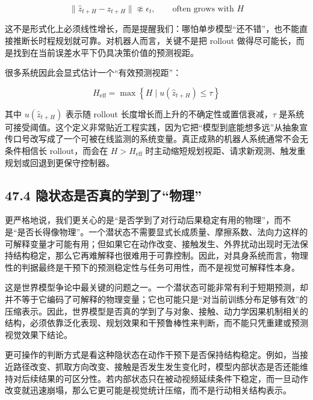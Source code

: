 \begingroup
\footnotesize
\begin{equation*}
\|\hat{z}_{t+H} - z_{t+H}\| \not\approx \epsilon_t,
\qquad
\text{often grows with } H
\end{equation*}
\endgroup

这不是形式化上必须线性增长，而是提醒我们：哪怕单步模型“还不错”，也不能直接推断长时程规划就可靠。对机器人而言，关键不是把 rollout 做得尽可能长，而是找到在当前误差水平下仍具决策价值的预测视距。

很多系统因此会显式估计一个“有效预测视距”：

\begingroup
\footnotesize
\begin{equation*}
H_{\mathrm{eff}} = \max \left\{ H \;|\; u(\hat{z}_{t+H}) \le \tau \right\}
\end{equation*}
\endgroup

其中 \(u(\hat{z}_{t+H})\) 表示随 rollout 长度增长而上升的不确定性或置信衰减，\(\tau\) 是系统可接受阈值。这个定义非常贴近工程实践，因为它把“模型到底能想多远”从抽象宣传口号改写成了一个可被在线监测的系统变量。真正成熟的机器人系统通常不会无条件相信长 rollout，而会在 \(H > H_{\mathrm{eff}}\) 时主动缩短规划视距、请求新观测、触发重规划或回退到更保守控制器。

\subsection*{47.4 隐状态是否真的学到了“物理”}


更严格地说，我们更关心的是“是否学到了对行动后果稳定有用的物理”，而不是“是否长得像物理”。一个潜状态不需要显式长成质量、摩擦系数、法向力这样的可解释变量才可能有用；但如果它在动作改变、接触发生、外界扰动出现时无法保持结构稳定，那么它再难解释也很难用于可靠控制。因此，对具身系统而言，物理性的判据最终是干预下的预测稳定性与任务可用性，而不是视觉可解释性本身。

这是世界模型争论中最关键的问题之一。一个潜状态可能非常有利于短期预测，却并不等于它编码了可解释的物理变量；它也可能只是“对当前训练分布足够有效”的压缩表示。因此，世界模型是否真的学到了与对象、接触、动力学因果机制相关的结构，必须依靠泛化表现、规划效果和干预鲁棒性来判断，而不能只凭重建或预测视觉效果下结论。

更可操作的判断方式是看这种隐状态在动作干预下是否保持结构稳定。例如，当接近路径改变、抓取方向改变、接触是否发生发生变化时，模型内部状态是否还能维持对后续结果的可区分性。若内部状态只在被动视频延续条件下稳定，而一旦动作改变就迅速崩塌，那么它更可能是视觉统计压缩，而不是行动相关结构表示。


